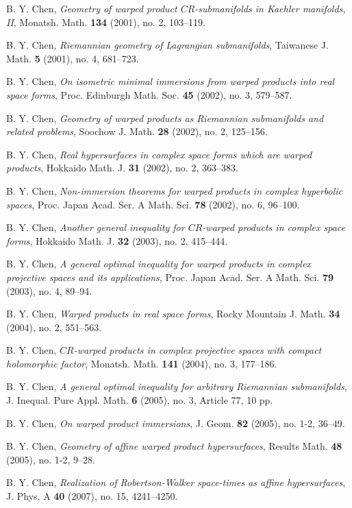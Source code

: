 \documentclass{amsart}
\theoremstyle{plain}
\numberwithin{equation}{section}
\theoremstyle{remark}
\numberwithin{equation}{section}
\begin{document}
\begin{thebibliography}{120}
 B. Y. Chen,  {\em  Geometry of warped product $CR$-submanifolds in Kaehler manifolds, II}, Monatsh. Math. {\bf 134} (2001), no. 2, 103--119.

 B. Y. Chen,  {\em  Riemannian geometry of Lagrangian submanifolds},  Taiwanese J. Math. {\bf 5} (2001), no. 4, 681--723.

 B. Y. Chen,  {\em On isometric minimal immersions  from warped products into real space forms}, Proc. Edinburgh Math. Soc. {\bf 45} (2002), no. 3, 579--587.

 B. Y. Chen,  {\em Geometry of warped products as Riemannian submanifolds and related problems},  Soochow J. Math. {\bf 28} (2002), no. 2, 125--156.

 B. Y. Chen,  {\em  Real hypersurfaces in complex space forms which are warped products}, {Hokkaido Math. J.} {\bf 31} (2002), no. 2, 363--383. 

 B. Y. Chen,  {\em  Non-immersion theorems for warped products in complex hyperbolic spaces}, Proc. Japan Acad. Ser. A Math. Sci. {\bf 78} (2002), no. 6, 96--100.

 B. Y. Chen,  {\em Another general inequality for $CR$-warped products in complex space forms},  Hokkaido Math. J. {\bf 32} (2003), no. 2, 415--444. 

 B. Y. Chen,  {\em  A general optimal inequality for warped products in complex projective spaces and its applications}, Proc. Japan Acad. Ser. A Math. Sci. {\bf 79} (2003), no. 4, 89--94.

 B. Y. Chen,  {\em Warped products in real space forms}, Rocky Mountain J. Math. {\bf 34} (2004), no. 2, 551--563.

 B. Y. Chen,  {\em  $CR$-warped products in complex projective spaces with compact holomorphic factor}, Monatsh. Math. {\bf 141} (2004), no. 3, 177--186.
 
  B. Y. Chen, {\it A general optimal inequality for arbitrary Riemannian submanifolds},  J. Inequal. Pure Appl. Math. {\bf 6} (2005), no. 3, Article 77, 10 pp.
 
 B. Y. Chen,  {\em  On warped product immersions}, J. Geom. {\bf 82} (2005), no. 1-2, 36--49. 

 B. Y. Chen,  {\it Geometry of affine warped product hypersurfaces}, Results Math. {\bf 48} (2005), no. 1-2,  9--28.

 B. Y. Chen, {\it  Realization of Robertson-Walker space-times as affine hypersurfaces}, J. Phys, A {\bf 40} (2007), no. 15, 4241--4250.


\end{thebibliography}
\end{document}
